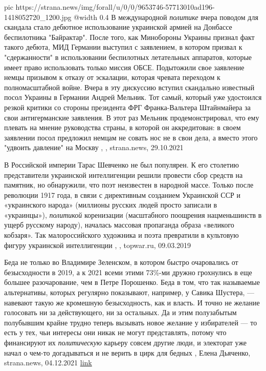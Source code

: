 \ifcmt
  pic https://strana.news/img/forall/u/0/0/9653746-57713010ad196-1418052720_1200.jpg
  @width 0.4
\fi
В международной \emph{политике} вчера поводом для скандала стало дебютное
использование украинской армией на Донбассе беспилотника "Байрактар". После
того, как Минобороны Украины признал факт такого дебюта, МИД Германии выступил
с заявлением, в котором призвал к "сдержанности" в использовании беспилотных
летательных аппаратов, которые имеет право использовать только миссия ОБСЕ.
Подытожили свое заявление немцы призывом к отказу от эскалации, которая чревата
переходом к полномасштабной войне.  Вчера в эту дискуссию вступил скандально
известный посол Украины в Германии Андрей Мельник. Тот самый, который уже
удостоился резкой критики со стороны президента ФРГ Франка-Вальтера Штайнмайера
за свои антигерманские заявления. В этот раз Мельник продемонстрировал, что ему
плевать на мнение руководства страны, в которой он аккредитован: в своем
заявлении посол предложил немцам не совать нос не в свои дела, а вместо этого
"удвоить давление" на Москву
, 
, strana.news, 29.10.2021

В Российской империи Тарас Шевченко не был популярен. К его столетию
представители украинской интеллигенции решили провести сбор средств на
памятник, но обнаружили, что поэт неизвестен в народной массе. Только после
революции 1917 года, в связи с директивным созданием Украинской ССР и
«украинского народа» (миллионы русских людей просто записали в «украинцы»),
\emph{политикой} коренизации (масштабного поощрения нацменьшинств в ущерб русскому
народу), началась массовая пропаганда образа «великого кобзаря». Так
малороссийского художника и поэта превратили в культовую фигуру украинской
интеллигенции
, , topwar.ru, 09.03.2019

Беда не только во Владимире Зеленском, в котором быстро очаровались от
безысходности в 2019, а к 2021 всеми этими 73\%-ми дружно грохнулись в еще
большее разочарование, чем в Петре Порошенко. Беда в том, что так называемые
альтернативы, которых регулярно показывают, например, у Савика Шустера, —
навевают такую же кромешную безысходность, как и власть. И точно не желание
голосовать ни за действующего, ни за остальных.  Да и этим полузабытым
полубывшим крайне трудно теперь вызывать новое желание у избирателей — то есть
у тех, чьи интересы они никак не могут представлять, потому что финансируют их
\emph{политическую} карьеру совсем другие люди, и электорат уже начал о чем-то
догадываться и не верить в цирк для бедных
, 
Елена Дьяченко, strana.news, 04.12.2021
\href{https://strana.news/opinions/365443-alternativy-vlasti-takaja-zhe-kromeshnaja-bezyskhodnost-kak-i-ona-sama.html}{link}

